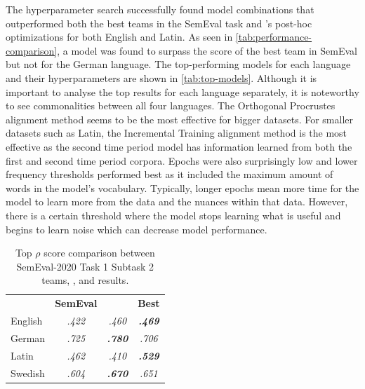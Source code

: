 The hyperparameter search successfully found model combinations that outperformed both the best teams in the SemEval task and \citet{kaiser-etal-2020-ims}’s post-hoc optimizations for both English and Latin. As seen in \autoref{tab:performance-comparison}, a model was found to surpass the score of the best team in SemEval but not \citet{kaiser-etal-2020-ims} for the German language. The top-performing models for each language and their hyperparameters are shown in \autoref{tab:top-models}. Although it is important to analyse the top results for each language separately, it is noteworthy to see commonalities between all four languages. The Orthogonal Procrustes alignment method seems to be the most effective for bigger datasets. For smaller datasets such as Latin, the Incremental Training alignment method is the most effective as the second time period model has information learned from both the first and second time period corpora. Epochs were also surprisingly low and lower frequency thresholds performed best as it included the maximum amount of words in the model’s vocabulary. Typically, longer epochs mean more time for the model to learn more from the data and the nuances within that data. However, there is a certain threshold where the model stops learning what is useful and begins to learn noise which can decrease model performance. 


\begin{table}[h]
\centering
\begin{tabular}{lccc} 
\toprule
\textbf{ } & \textbf{SemEval } & \textbf{\citet{kaiser-etal-2020-ims} }         & \textbf{Best }            \\
English    & \textit{ .422 }   & \textit{ .460 }          & \textbf{\textit{ .469 }}  \\
German     & \textit{ .725 }   & \textit{\textbf{ .780 }} & \textit{ .706 }           \\
Latin      & \textit{ .462 }   & \textit{ .410 }          & \textbf{\textit{ .529 }}  \\
Swedish    & \textit{ .604 }   & \textit{\textbf{ .670 }} & \textit{ .651 }           \\
\bottomrule
\end{tabular}
\caption{Top $\rho$ score comparison between SemEval-2020 Task 1 Subtask 2 teams, \citet{kaiser-etal-2020-ims}, and results.}
\label{tab:performance-comparison}
\end{table}


